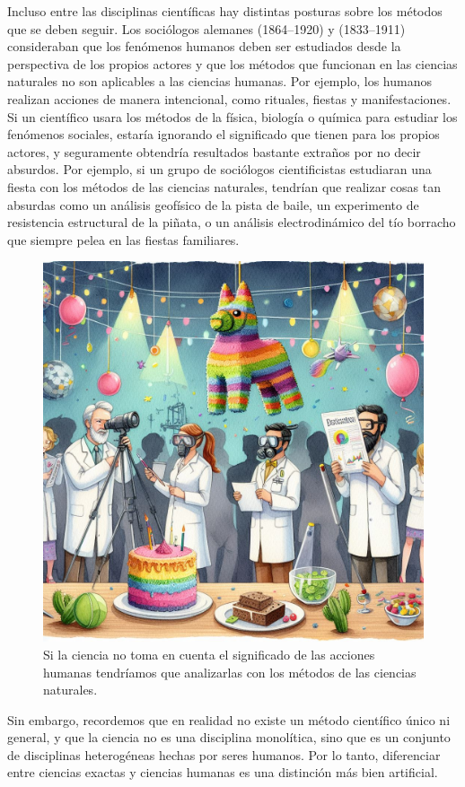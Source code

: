 Incluso entre las disciplinas científicas hay distintas posturas sobre los
métodos que se deben seguir.
Los sociólogos alemanes  (1864--1920) y
 (1833--1911) consideraban que los
fenómenos humanos deben ser estudiados desde la perspectiva de los propios
actores y que los métodos que funcionan en las ciencias naturales no son
aplicables a las ciencias humanas.
Por ejemplo, los humanos realizan acciones de manera intencional, como rituales,
fiestas y manifestaciones.
Si un científico usara los métodos de la física, biología o química para
estudiar los fenómenos sociales, estaría ignorando el significado que tienen
para los propios actores, y seguramente obtendría resultados bastante extraños
por no decir absurdos.
Por ejemplo, si un grupo de sociólogos cientificistas estudiaran una fiesta con
los métodos de las ciencias naturales, tendrían que realizar cosas tan absurdas
como un análisis geofísico de la pista de baile, un experimento de resistencia
estructural de la piñata, o un análisis electrodinámico del tío borracho que
siempre pelea en las fiestas familiares.

\begin{figure}[ht]
    \centering
    \includegraphics[width=0.8\linewidth]{img/fiesta}
    \caption{Si la ciencia no toma en cuenta el significado de las acciones
        humanas tendríamos que analizarlas con los métodos de las ciencias
        naturales.}
\end{figure}

Sin embargo, recordemos que en realidad no existe un método científico único ni
general, y que la ciencia no es una disciplina monolítica, sino que es un
conjunto de disciplinas heterogéneas hechas por seres humanos.
Por lo tanto, diferenciar entre ciencias exactas y ciencias humanas es una
distinción más bien artificial.

